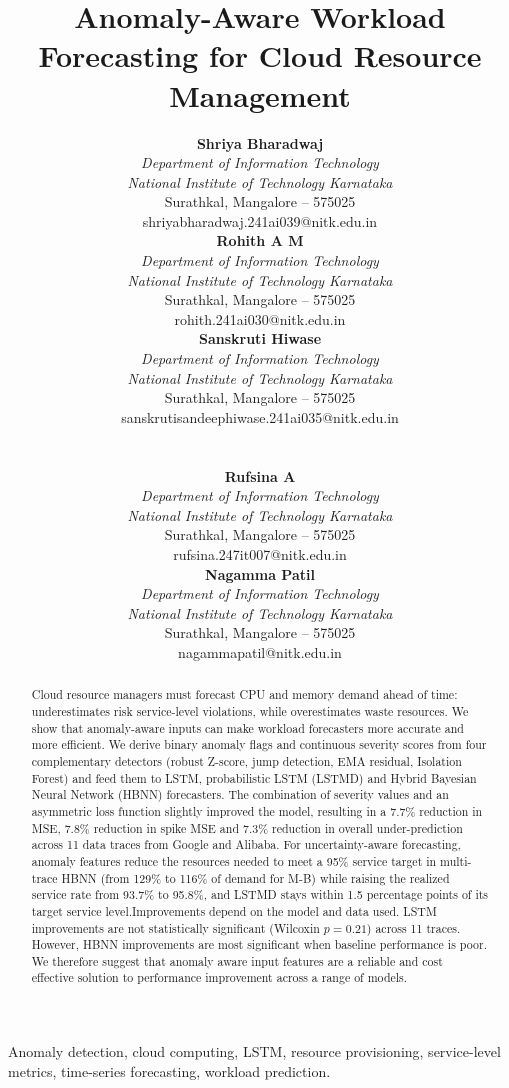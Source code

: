 \documentclass[conference]{IEEEtran}
\newcommand{\authorcell}[2]{%
\parbox[t]{0.315\textwidth}{\centering\footnotesize
\textbf{#1}\\
\textit{Department of Information Technology}\\
\textit{National Institute of Technology Karnataka}\\
Surathkal, Mangalore -- 575025\\
{\scriptsize #2}}}
\begin{document}
\title{Anomaly-Aware Workload Forecasting for Cloud Resource Management}

\author{
\authorcell{Shriya Bharadwaj}{shriyabharadwaj.241ai039@nitk.edu.in}
\hfill
\authorcell{Rohith A M}{rohith.241ai030@nitk.edu.in}
\hfill
\authorcell{Sanskruti Hiwase}{sanskrutisandeephiwase.241ai035@nitk.edu.in}
\\[6pt]
\hfill
\authorcell{Rufsina A}{rufsina.247it007@nitk.edu.in}
\hspace{2em}
\authorcell{Nagamma Patil}{nagammapatil@nitk.edu.in}
\hfill
}
\maketitle

\begin{abstract}
Cloud resource managers must forecast CPU and memory demand ahead of time:
underestimates risk service-level violations, while overestimates waste
resources. We show that anomaly-aware inputs can make workload forecasters more
accurate and more efficient. We derive binary anomaly flags and continuous
severity scores from four complementary detectors (robust Z-score, jump
detection, EMA residual, Isolation Forest) and feed them to LSTM, probabilistic
LSTM (LSTMD) and Hybrid Bayesian Neural Network (HBNN) forecasters. The combination of severity values and an asymmetric loss function slightly improved the model, resulting in a 7.7\% reduction in MSE, 7.8\% reduction in spike MSE and 7.3\% reduction in overall under-prediction across 11 data traces from Google and Alibaba. For
uncertainty-aware forecasting, anomaly features reduce the resources needed to
meet a 95\% service target in multi-trace HBNN (from 129\% to 116\% of demand for
M-B) while raising the realized service rate from 93.7\% to 95.8\%, and LSTMD
stays within 1.5 percentage points of its target service level.Improvements depend on the model and data used. LSTM improvements are not statistically significant (Wilcoxin $p=0.21$) across 11 traces. However, HBNN improvements are most significant when baseline performance is poor. We therefore suggest that anomaly aware input features are a reliable and cost effective solution to performance improvement across a range of models.
\end{abstract}

\begin{IEEEkeywords}
Anomaly detection, cloud computing, LSTM, resource provisioning,
service-level metrics, time-series forecasting, workload prediction.
\end{IEEEkeywords}
\end{document}
